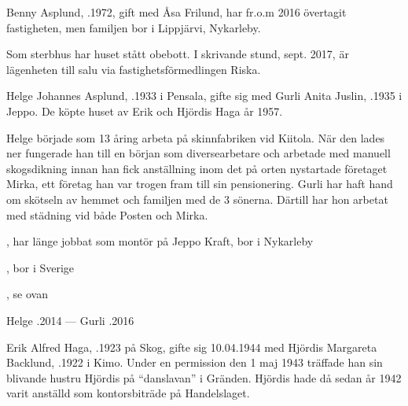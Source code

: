 



%


%
Benny Asplund, .1972, gift med Åsa Frilund, har fr.o.m 2016 övertagit fastigheten, men familjen bor i Lippjärvi, Nykarleby. \jhvspace{}


%
Som sterbhus har huset stått obebott. I skrivande stund, sept. 2017, är lägenheten till salu via fastighetsförmedlingen Riska. \jhvspace{}



%
Helge Johannes Asplund, .1933 i Pensala, gifte sig med Gurli Anita Juslin, .1935 i Jeppo. De köpte huset av Erik och Hjördis Haga år 1957.

Helge började som 13 åring arbeta på skinnfabriken vid Kiitola. När den lades ner fungerade han till en början som diversearbetare och arbetade med manuell skogsdikning innan han fick anställning inom det på orten nystartade företaget Mirka, ett företag han var trogen fram till sin pensionering. Gurli har haft hand om skötseln av hemmet och familjen med de 3 sönerna. Därtill har hon arbetat med städning vid både Posten och Mirka.
\begin{jhchildren}
  \item {}, har länge jobbat som montör på Jeppo Kraft, bor i Nykarleby
  \item {}, bor i Sverige
  \item {}, se ovan
\end{jhchildren}

Helge .2014  ---  Gurli .2016


%
Erik Alfred Haga, .1923 på Skog, gifte sig 10.04.1944 med Hjördis Margareta Backlund, .1922 i Kimo. Under en permission den 1 maj 1943 träffade han sin blivande hustru Hjördis på ``danslavan'' i Gränden. Hjördis hade då sedan år 1942 varit anställd som kontorsbiträde på Handelslaget.

